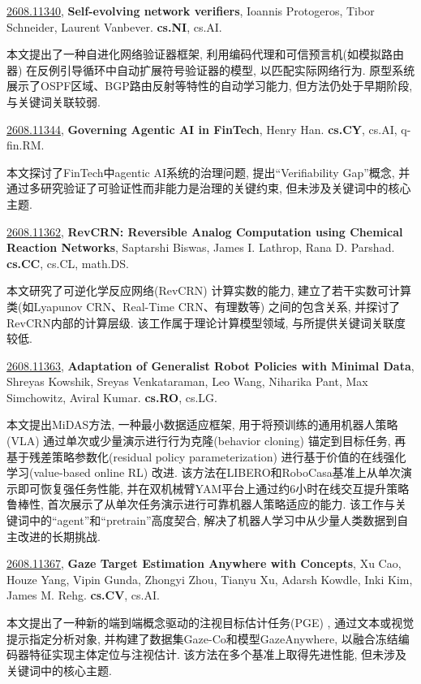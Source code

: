 \documentclass[9pt, a4paper]{article}
\theoremstyle{plain}
\theoremstyle{definition}
\theoremstyle{remark}
\newcommand{\arxivwithtarget}[3]{\hypertarget{#1}{}\href{https://arxiv.org/abs/#1}{#1}, \textbf{\textcolor{arxivblue}{#2}}, #3. }
\begin{document}
\arxivwithtarget{2608.11340}{Self-evolving network verifiers}{Ioannis Protogeros, Tibor Schneider, Laurent Vanbever}\textbf{cs.NI}, cs.AI.

本文提出了一种自进化网络验证器框架, 利用编码代理和可信预言机(如模拟路由器) 在反例引导循环中自动扩展符号验证器的模型, 以匹配实际网络行为. 原型系统展示了OSPF区域、BGP路由反射等特性的自动学习能力, 但方法仍处于早期阶段, 与关键词关联较弱.


\arxivwithtarget{2608.11344}{Governing Agentic AI in FinTech}{Henry Han}\textbf{cs.CY}, cs.AI, q-fin.RM.

本文探讨了FinTech中agentic AI系统的治理问题, 提出“Verifiability Gap”概念, 并通过多研究验证了可验证性而非能力是治理的关键约束, 但未涉及关键词中的核心主题.


\arxivwithtarget{2608.11362}{RevCRN: Reversible Analog Computation using Chemical Reaction Networks}{Saptarshi Biswas, James I. Lathrop, Rana D. Parshad}\textbf{cs.CC}, cs.CL, math.DS.

本文研究了可逆化学反应网络(RevCRN) 计算实数的能力, 建立了若干实数可计算类(如Lyapunov CRN、Real-Time CRN、有理数等) 之间的包含关系, 并探讨了RevCRN内部的计算层级. 该工作属于理论计算模型领域, 与所提供关键词关联度较低.


\arxivwithtarget{2608.11363}{Adaptation of Generalist Robot Policies with Minimal Data}{Shreyas Kowshik, Sreyas Venkataraman, Leo Wang, Niharika Pant, Max Simchowitz, Aviral Kumar}\textbf{cs.RO}, cs.LG.

本文提出MiDAS方法, 一种最小数据适应框架, 用于将预训练的通用机器人策略(VLA) 通过单次或少量演示进行行为克隆(behavior cloning) 锚定到目标任务, 再基于残差策略参数化(residual policy parameterization) 进行基于价值的在线强化学习(value-based online RL) 改进. 该方法在LIBERO和RoboCasa基准上从单次演示即可恢复强任务性能, 并在双机械臂YAM平台上通过约6小时在线交互提升策略鲁棒性, 首次展示了从单次任务演示进行可靠机器人策略适应的能力. 该工作与关键词中的“agent”和“pretrain”高度契合, 解决了机器人学习中从少量人类数据到自主改进的长期挑战.


\arxivwithtarget{2608.11367}{Gaze Target Estimation Anywhere with Concepts}{Xu Cao, Houze Yang, Vipin Gunda, Zhongyi Zhou, Tianyu Xu, Adarsh Kowdle, Inki Kim, James M. Rehg}\textbf{cs.CV}, cs.AI.

本文提出了一种新的端到端概念驱动的注视目标估计任务(PGE) , 通过文本或视觉提示指定分析对象, 并构建了数据集Gaze-Co和模型GazeAnywhere, 以融合冻结编码器特征实现主体定位与注视估计. 该方法在多个基准上取得先进性能, 但未涉及关键词中的核心主题.
\end{document}
